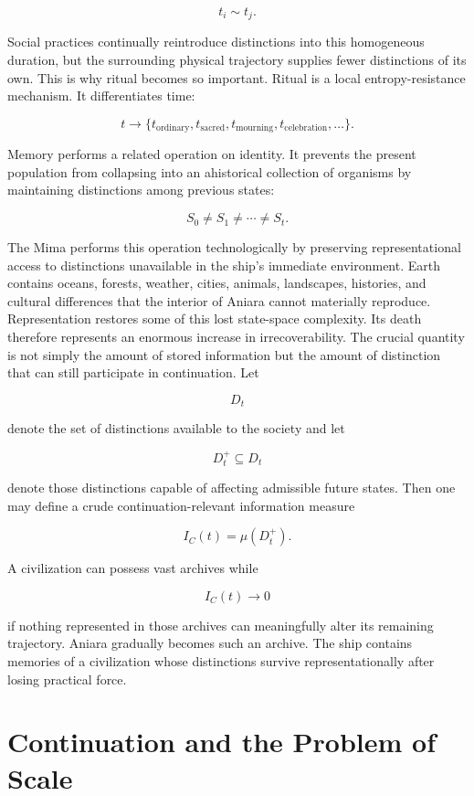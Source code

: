 \documentclass[11pt,oneside]{book}
\theoremstyle{definition}
\theoremstyle{remark}
\begin{document}
\[
t_i\sim t_j.
\]

Social practices continually reintroduce distinctions into this homogeneous duration, but the
surrounding physical trajectory supplies fewer distinctions of its own. This is why ritual becomes
so important. Ritual is a local entropy-resistance mechanism. It differentiates time:

\[
t\rightarrow \{ t_{\mathrm{ordinary}}, t_{\mathrm{sacred}}, t_{\mathrm{mourning}}, t_{\mathrm{celebration}}, \ldots \}.
\]

Memory performs a related operation on identity. It prevents the present population from collapsing
into an ahistorical collection of organisms by maintaining distinctions among previous states:

\[
S_0\neq S_1\neq\cdots\neq S_t.
\]

The Mima performs this operation technologically by preserving representational access to
distinctions unavailable in the ship's immediate environment. Earth contains oceans, forests,
weather, cities, animals, landscapes, histories, and cultural differences that the interior of
Aniara cannot materially reproduce. Representation restores some of this lost state-space
complexity. Its death therefore represents an enormous increase in irrecoverability. The crucial
quantity is not simply the amount of stored information but the amount of distinction that can still
participate in continuation. Let

\[
D_t
\]

denote the set of distinctions available to the society and let

\[
D_t^{+}\subseteq D_t
\]

denote those distinctions capable of affecting admissible future states. Then one may define a crude
continuation-relevant information measure

\[
I_C(t)=\mu(D_t^{+}).
\]

A civilization can possess vast archives while

\[
I_C(t)\rightarrow0
\]

if nothing represented in those archives can meaningfully alter its remaining trajectory. Aniara
gradually becomes such an archive. The ship contains memories of a civilization whose distinctions
survive representationally after losing practical force.

\section{Continuation and the Problem of Scale}
\end{document}

